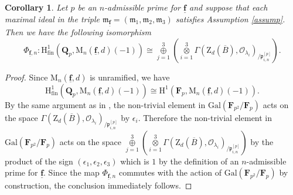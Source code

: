 \documentclass[10pt]{amsart}
\numberwithin{equation}{section}
\theoremstyle{plain}
\newtheorem{corollary}[theorem]{Corollary}
\numberwithin{equation}{section}
\theoremstyle{definition}
\theoremstyle{remark}
\def\Gal{\mathrm{Gal}}
\def\frakm{\mathfrak{m}}
\def\triplef{\underline{\mathbf{f}}}
\def\threetensor{\overset{3}{\underset{i=1}\otimes}}
\def\threesum{\overset{3}{\underset{j=1}\oplus} }
\def\calO{\mathcal{O}}
\def\frakm{\mathfrak{m}}
\def\frakp{\mathfrak{p}}
\def\FF{\mathbf{F}}
\def\QQ{\mathbf{Q}}
\def\rmH{\mathrm{H}}
\def\rmM{\mathrm{M}}
\def\rmZ{\mathrm{Z}}
\begin{document}
\begin{corollary}\label{level-raise-Q}
Let $p$ be an $n$-admissible prime for $\triplef$ and suppose that each maximal ideal in the triple $\frakm_{\triplef}=(\frakm_{1}, \frakm_{2}, \frakm_{3})$ satisfies Assumption \ref{assump}. Then we have the following isomorphism
\begin{equation*}
\Phi_{\triplef, n}: \rmH^{1}_{\mathrm{fin}}(\QQ_{p}, \rmM_{n}(\triplef, d)(-1))\cong \threesum(\threetensor\Gamma(\rmZ_{d}(\overline{B}),\calO_{\lambda_{i}})_{/\frakp^{[p]}_{i, n}}).
\end{equation*}
\end{corollary}
\begin{proof}
Since $\rmM_{n}(\triplef, d)$ is unramified, we have 
\begin{equation*}
\rmH^{1}_{\mathrm{fin}}(\QQ_{p}, \rmM_{n}(\triplef, d)(-1))\cong\rmH^{1}(\FF_{p}, \rmM_{n}(\triplef, d)(-1)).  
\end{equation*}
By the same argument as in \cite[Proposition 3.8]{Ri-100}, the non-trivial element in $\Gal(\FF_{p^{2}}/\FF_{p})$ acts on the space $\Gamma(\rmZ_{d}(\overline{B}),\calO_{\lambda_{i}})_{/\frakp^{[p]}_{i, n}}$ by $\epsilon_{i}$. Therefore the non-trivial element in $\Gal(\FF_{p^{2}}/\FF_{p})$ acts on the space
$\threesum(\threetensor\Gamma(\rmZ_{d}(\overline{B}),\calO_{\lambda_{i}})_{/\frakp^{[p]}_{i, n}})$
by the product of the sign $(\epsilon_{1}, \epsilon_{2}, \epsilon_{3})$ which is $1$ by the definition of an $n$-admissible prime for $\triplef$. Since the map $\Phi_{\triplef, n}$ commutes with the action of $\Gal(\FF_{p^{2}}/\FF_{p})$ by construction, the conclusion immediately follows. 
\end{proof}
\end{document}
